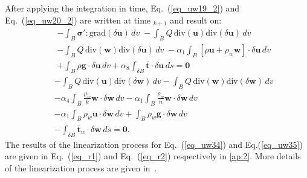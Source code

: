 \documentclass[preprint,12pt,a4paper]{elsarticle}
\begin{document}
After applying the integration in time,  Eq.~(\ref{eq_uw19_2}) and Eq.~(\ref{eq_uw20_2}) are written at time $_{k+1}$ and result on:
\begin{eqnarray} \label{eq_uw34}
&&-\int_B \boldsymbol{ \sigma'}:\mbox{grad}(\delta\boldsymbol{u}) \, dv \; -\int_B  Q \, \mbox{div}(\boldsymbol{u}) \mbox{div}(\delta\boldsymbol{u}) \, dv  \nonumber \\ 
&& -\int_B  Q \, \mbox{div}(\boldsymbol{w}) \mbox{div}(\delta\boldsymbol{u}) \, dv \;  - \alpha_1 \int_B \left[\rho\boldsymbol{u}+\rho_w \boldsymbol{w}\right]\cdot\delta\boldsymbol{u} \, dv 
\nonumber \\
&&+ \int_B \rho\boldsymbol{g}\cdot\delta\boldsymbol{u} \, dv+ \alpha_8 \int_{\delta B} \boldsymbol{\overline{t}}\cdot\delta\boldsymbol{u} \, ds=\boldsymbol{0}
\end{eqnarray}
\begin{eqnarray} \label{eq_uw35}
&&-\int_B Q \, \mbox{div}(\boldsymbol{u}) \mbox{div}(\delta \boldsymbol{w}) \, dv  -\int_B Q \, \mbox{div}(\boldsymbol{w}) \mbox{div}(\delta \boldsymbol{w}) \, dv 
\nonumber\\
&&- \alpha_4\int_B\frac{\mu_w}{k}\boldsymbol{w} \cdot \delta \boldsymbol{w} \, dv 
-\alpha_1 \int_B \frac{\rho_w}{n}\boldsymbol{w}\cdot \delta \boldsymbol{w} \, dv
\nonumber\\
&&-\alpha_1\int_B \rho_w\boldsymbol{u} \cdot \delta \boldsymbol{w} \, dv+\int_B \rho_w\boldsymbol{g} \cdot \delta \boldsymbol{w} \, dv 
\nonumber\\
&&-\int_{\delta B}\boldsymbol{\overline{t}}_w\cdot\delta\boldsymbol{w} \, ds =\boldsymbol{0}.
\end{eqnarray}
The results of the linearization process for  Eq.~(\ref{eq_uw34}) and Eq.(\ref{eq_uw35}) are given in Eq.~(\ref{eq_r1}) and Eq.~(\ref{eq_r2}) respectively in \ref{ap:2}. More details of the linearization process are given in~\cite{Navas:17c}.

\end{document}
